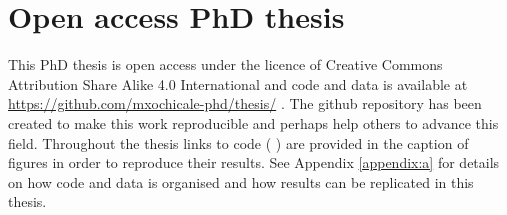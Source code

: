 \section{Open access PhD thesis}
This PhD thesis is open access under the licence of   
Creative Commons Attribution Share Alike 4.0 International 
and code and data is available at 
\url{https://github.com/mxochicale-phd/thesis/} \citep{xochicale2019}.
The github repository has been created 
to make this work reproducible 
and perhaps help others to advance this field.
Throughout the thesis links to \R code (\,\codeicon\,) 
are provided in the caption of figures in 
order to reproduce their results.
See Appendix \ref{appendix:a}
for details on how code and data 
is organised and how results can be replicated 
in this thesis. 

